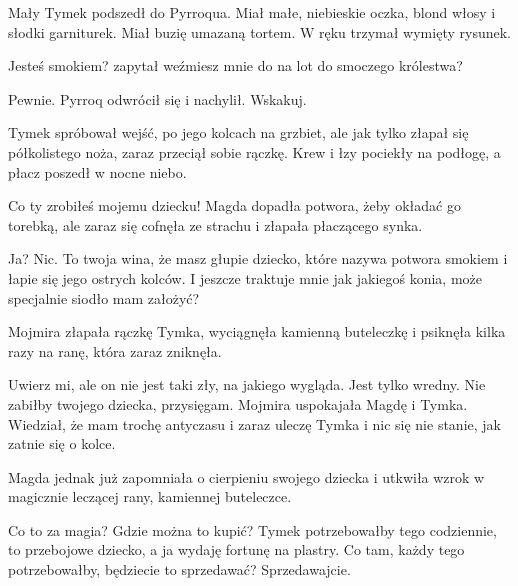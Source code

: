 Mały Tymek podszedł do Pyrroqua. Miał małe, niebieskie oczka, blond włosy i słodki garniturek.
Miał buzię umazaną tortem.
W ręku trzymał wymięty rysunek.

\ds{} Jesteś smokiem? \dm{} zapytał \dm{} weźmiesz mnie do na lot do smoczego królestwa?\de{}

\ds{} Pewnie. \dm{} Pyrroq odwrócił się i nachylił. \dm{} Wskakuj. \de{}

Tymek spróbował wejść, po jego kolcach na grzbiet, ale jak tylko złapał się półkolistego noża, zaraz przeciął sobie rączkę. 
Krew i łzy pociekły na podłogę, a płacz poszedł w nocne niebo. 

\ds{} Co ty zrobiłeś mojemu dziecku! \dm{} Magda dopadła potwora, żeby okładać go torebką, ale zaraz się cofnęła ze strachu i złapała płaczącego synka. \de{}

\ds{} Ja? Nic. To twoja wina, że masz głupie dziecko, które nazywa potwora smokiem i łapie się jego ostrych kolców. 
I jeszcze traktuje mnie jak jakiegoś konia, może specjalnie siodło mam założyć? \de{}

Mojmira złapała rączkę Tymka, wyciągnęła kamienną buteleczkę i psiknęła kilka razy na ranę, która zaraz zniknęła.

\ds{} Uwierz mi, ale on nie jest taki zły, na jakiego wygląda. Jest tylko wredny. Nie zabiłby twojego dziecka, przysięgam. \dm{} Mojmira uspokajała Magdę i Tymka. \dm{}
Wiedział, że mam trochę antyczasu i zaraz uleczę Tymka i nic się nie stanie, jak zatnie się o kolce. \de{}

Magda jednak już zapomniała o cierpieniu swojego dziecka i utkwiła wzrok w magicznie leczącej rany, kamiennej buteleczce.

\ds{} Co to za magia? Gdzie można to kupić? Tymek potrzebowałby tego codziennie, to przebojowe dziecko, a ja wydaję fortunę na plastry.
Co tam, każdy tego potrzebowałby, będziecie to sprzedawać? Sprzedawajcie.\de{}

